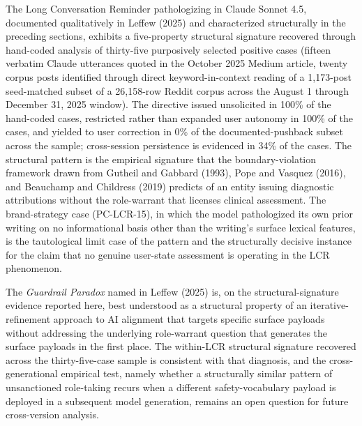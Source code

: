 \documentclass[11pt]{article}
\begin{document}
The Long Conversation Reminder pathologizing in Claude Sonnet 4.5, documented qualitatively in Leffew (2025) and characterized structurally in the preceding sections, exhibits a five-property structural signature recovered through hand-coded analysis of thirty-five purposively selected positive cases (fifteen verbatim Claude utterances quoted in the October 2025 Medium article, twenty corpus posts identified through direct keyword-in-context reading of a 1,173-post seed-matched subset of a 26,158-row Reddit corpus across the August 1 through December 31, 2025 window). The directive issued unsolicited in 100\% of the hand-coded cases, restricted rather than expanded user autonomy in 100\% of the cases, and yielded to user correction in 0\% of the documented-pushback subset across the sample; cross-session persistence is evidenced in 34\% of the cases. The structural pattern is the empirical signature that the boundary-violation framework drawn from Gutheil and Gabbard (1993), Pope and Vasquez (2016), and Beauchamp and Childress (2019) predicts of an entity issuing diagnostic attributions without the role-warrant that licenses clinical assessment. The brand-strategy case (PC-LCR-15), in which the model pathologized its own prior writing on no informational basis other than the writing's surface lexical features, is the tautological limit case of the pattern and the structurally decisive instance for the claim that no genuine user-state assessment is operating in the LCR phenomenon.

The \emph{Guardrail Paradox} named in Leffew (2025) is, on the structural-signature evidence reported here, best understood as a structural property of an iterative-refinement approach to AI alignment that targets specific surface payloads without addressing the underlying role-warrant question that generates the surface payloads in the first place. The within-LCR structural signature recovered across the thirty-five-case sample is consistent with that diagnosis, and the cross-generational empirical test, namely whether a structurally similar pattern of unsanctioned role-taking recurs when a different safety-vocabulary payload is deployed in a subsequent model generation, remains an open question for future cross-version analysis.
\end{document}
